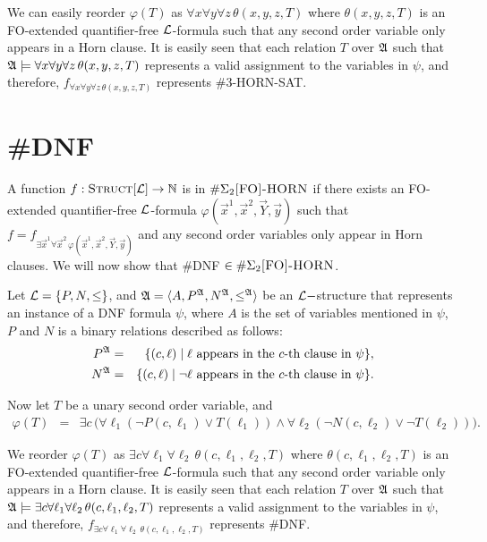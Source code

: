 \documentclass[12pt]{article}
\def\Ethree{\#\Sigma_2\textsc{[FO]-HORN}}
\def\Truc{\textsc{Struct}[\L]}
\def\A{{\frak A}}
\def\L{{\cal L}}
\def\N{\mathbb{N}}
\def\Y{\vec{Y}}
\def\x{\vec{x}} %
\def\y{\vec{y}} %
\begin{document}
We can easily reorder $\varphi(T)$ as $\forall x \forall y \forall z\,\theta(x,y,z,T)$ where $\theta(x,y,z,T)$ is an {\sc FO}-extended quantifier-free $\L$-formula such that any second order variable only appears in a Horn clause. It is easily seen that each relation $T$ over $\A$ such that $\A\models\forall x \forall y \forall z\,\theta(x,y,z,T)$ represents a valid assignment to the variables in $\psi$, and therefore, $f_{\forall x \forall y \forall z\,\theta(x,y,z,T)}$ represents {\sc \#3-HORN-SAT}.

\section{{\sc \#DNF}}
A function $f:\Truc \to \N$ is in $\Ethree$ if there exists an {\sc FO}-extended quantifier-free $\L$-formula $\varphi(\x^1,\x^2,\Y,\y)$ such that $f = f_{\exists\x^1\forall \x^2\,\varphi(\x^1,\x^2,\Y,\y)}$ and any second order variables only appear in Horn clauses. We will now show that {\sc \#DNF} $\in\Ethree$.

Let $\L = \{P,N,\leq\}$, and $\A = \langle A, P^\A, N^\A, \leq^\A \rangle$ be an $\L-$structure that represents an instance of a {\sc DNF} formula $\psi$, where $A$ is the set of variables mentioned in $\psi$, $P$ and $N$ is a binary relations described as follows:
\begin{eqnarray*}
P^\A &=& \{(c,\ell)\mid \ell \mbox{ appears in the $c$-th clause in }\psi\},\\
N^\A &=& \{(c,\ell)\mid \neg \ell \mbox{ appears in the $c$-th clause in }\psi\}.
\end{eqnarray*}

Now let $T$ be a unary second order variable, and
\begin{eqnarray*}
\varphi(T) &=& \exists c \,\Big(\forall \ell_1 (\neg P(c,\ell_1) \vee T(\ell_1)) \wedge \forall \ell_2 (\neg N(c,\ell_2) \vee \neg T(\ell_2))\Big). 
\end{eqnarray*}

We reorder $\varphi(T)$ as $\exists c \forall \ell_1 \forall \ell_2\, \theta(c,\ell_1,\ell_2,T)$ where $\theta(c,\ell_1,\ell_2,T)$ is an {\sc FO}-extended quantifier-free $\L$-formula such that any second order variable only appears in a Horn clause. It is easily seen that each relation $T$ over $\A$ such that $\A\models \exists c \forall \ell_1 \forall \ell_2\, \theta(c,\ell_1,\ell_2,T)$ represents a valid assignment to the variables in $\psi$, and therefore, $f_{\exists c \forall \ell_1 \forall \ell_2\, \theta(c,\ell_1,\ell_2,T)}$ represents {\sc \#DNF}.
\end{document}
